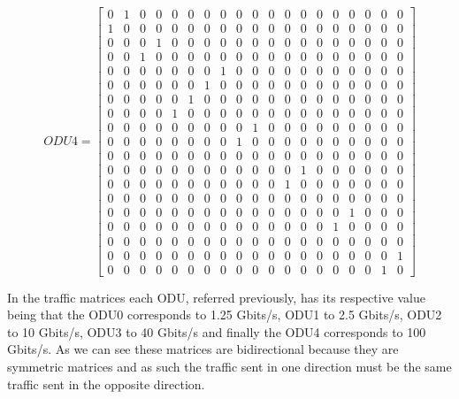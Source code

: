 \[
ODU4=
  \begin{bmatrix}
    0 & 1 & 0 & 0 & 0 & 0 & 0 & 0 & 0 & 0 & 0 & 0 & 0 & 0 & 0 & 0 & 0 & 0 & 0 \\
    1 & 0 & 0 & 0 & 0 & 0 & 0 & 0 & 0 & 0 & 0 & 0 & 0 & 0 & 0 & 0 & 0 & 0 & 0 \\
    0 & 0 & 0 & 1 & 0 & 0 & 0 & 0 & 0 & 0 & 0 & 0 & 0 & 0 & 0 & 0 & 0 & 0 & 0 \\
    0 & 0 & 1 & 0 & 0 & 0 & 0 & 0 & 0 & 0 & 0 & 0 & 0 & 0 & 0 & 0 & 0 & 0 & 0 \\
    0 & 0 & 0 & 0 & 0 & 0 & 0 & 1 & 0 & 0 & 0 & 0 & 0 & 0 & 0 & 0 & 0 & 0 & 0 \\
    0 & 0 & 0 & 0 & 0 & 0 & 1 & 0 & 0 & 0 & 0 & 0 & 0 & 0 & 0 & 0 & 0 & 0 & 0 \\
    0 & 0 & 0 & 0 & 0 & 1 & 0 & 0 & 0 & 0 & 0 & 0 & 0 & 0 & 0 & 0 & 0 & 0 & 0 \\
    0 & 0 & 0 & 0 & 1 & 0 & 0 & 0 & 0 & 0 & 0 & 0 & 0 & 0 & 0 & 0 & 0 & 0 & 0 \\
    0 & 0 & 0 & 0 & 0 & 0 & 0 & 0 & 0 & 1 & 0 & 0 & 0 & 0 & 0 & 0 & 0 & 0 & 0 \\
    0 & 0 & 0 & 0 & 0 & 0 & 0 & 0 & 1 & 0 & 0 & 0 & 0 & 0 & 0 & 0 & 0 & 0 & 0 \\
    0 & 0 & 0 & 0 & 0 & 0 & 0 & 0 & 0 & 0 & 0 & 0 & 0 & 0 & 0 & 0 & 0 & 0 & 0 \\
    0 & 0 & 0 & 0 & 0 & 0 & 0 & 0 & 0 & 0 & 0 & 0 & 1 & 0 & 0 & 0 & 0 & 0 & 0 \\
    0 & 0 & 0 & 0 & 0 & 0 & 0 & 0 & 0 & 0 & 0 & 1 & 0 & 0 & 0 & 0 & 0 & 0 & 0 \\
    0 & 0 & 0 & 0 & 0 & 0 & 0 & 0 & 0 & 0 & 0 & 0 & 0 & 0 & 0 & 0 & 0 & 0 & 0 \\
    0 & 0 & 0 & 0 & 0 & 0 & 0 & 0 & 0 & 0 & 0 & 0 & 0 & 0 & 0 & 1 & 0 & 0 & 0 \\
    0 & 0 & 0 & 0 & 0 & 0 & 0 & 0 & 0 & 0 & 0 & 0 & 0 & 0 & 1 & 0 & 0 & 0 & 0 \\
    0 & 0 & 0 & 0 & 0 & 0 & 0 & 0 & 0 & 0 & 0 & 0 & 0 & 0 & 0 & 0 & 0 & 0 & 0 \\
    0 & 0 & 0 & 0 & 0 & 0 & 0 & 0 & 0 & 0 & 0 & 0 & 0 & 0 & 0 & 0 & 0 & 0 & 1 \\
    0 & 0 & 0 & 0 & 0 & 0 & 0 & 0 & 0 & 0 & 0 & 0 & 0 & 0 & 0 & 0 & 0 & 1 & 0
  \end{bmatrix}
\]

\vspace{11pt}
In the traffic matrices each ODU, referred previously, has its respective value being that the ODU0 corresponds to 1.25 Gbits/s, ODU1 to 2.5 Gbits/s, ODU2 to 10 Gbits/s, ODU3 to 40 Gbits/s and finally the ODU4 corresponds to 100 Gbits/s.
As we can see these matrices are bidirectional because they are symmetric matrices and as such the traffic sent in one direction must be the same traffic sent in the opposite direction.

